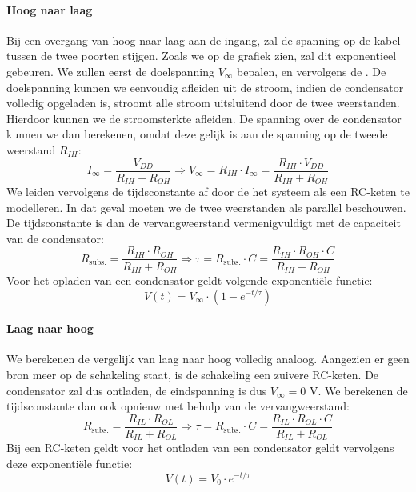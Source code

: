 \paragraph{Hoog naar laag}
Bij een overgang van hoog naar laag aan de ingang, zal de spanning op de kabel tussen de twee poorten stijgen. Zoals we op de grafiek zien, zal dit exponentieel gebeuren. We zullen eerst de doelspanning $V_{\infty}$ bepalen, en vervolgens de . De doelspanning kunnen we eenvoudig afleiden uit de stroom, indien de condensator volledig opgeladen is, stroomt alle stroom uitsluitend door de twee weerstanden. Hierdoor kunnen we de stroomsterkte afleiden. De spanning over de condensator kunnen we dan berekenen, omdat deze gelijk is aan de spanning op de tweede weerstand $R_{IH}$:
\begin{equation}
I_{\infty}=\displaystyle\frac{V_{DD}}{R_{IH}+R_{OH}}\Rightarrow V_{\infty}=R_{IH}\cdot I_{\infty}=\displaystyle\frac{R_{IH}\cdot V_{DD}}{R_{IH}+R_{OH}}
\label{eqn:vInfty}
\end{equation}
We leiden vervolgens de tijdsconstante af door de het systeem als een RC-keten te modelleren. In dat geval moeten we de twee weerstanden als parallel beschouwen. De tijdsconstante is dan de vervangweerstand vermenigvuldigt met de capaciteit van de condensator:
\begin{equation}
R_{\mbox{subs.}}=\displaystyle\frac{R_{IH}\cdot R_{OH}}{R_{IH}+R_{OH}}\Rightarrow \tau=R_{\mbox{subs.}}\cdot C=\displaystyle\frac{R_{IH}\cdot R_{OH}\cdot C}{R_{IH}+R_{OH}}
\label{eqn:tauHL}
\end{equation}
Voor het opladen van een condensator geldt volgende exponenti\"ele functie:
\begin{equation}
V\left(t\right)=V_{\infty}\cdot\left(1-e^{-t/\tau}\right)
\end{equation}
\paragraph{Laag naar hoog}
We berekenen de vergelijk van laag naar hoog volledig analoog. Aangezien er geen bron meer op de schakeling staat, is de schakeling een zuivere RC-keten. De condensator zal dus ontladen, de eindspanning is dus $V_{\infty}=0\mbox{ V}$. We berekenen de tijdsconstante dan ook opnieuw met behulp van de vervangweerstand:
\begin{equation}
R_{\mbox{subs.}}=\displaystyle\frac{R_{IL}\cdot R_{OL}}{R_{IL}+R_{OL}}\Rightarrow \tau=R_{\mbox{subs.}}\cdot C=\displaystyle\frac{R_{IL}\cdot R_{OL}\cdot C}{R_{IL}+R_{OL}}
\label{eqn:tauLH}
\end{equation}
Bij een RC-keten geldt voor het ontladen van een condensator geldt vervolgens deze exponenti\"ele functie:
\begin{equation}
V\left(t\right)=V_0\cdot e^{-t/\tau}
\end{equation}
